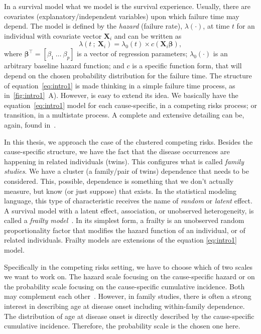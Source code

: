 In a survival model what we model is the survival experience. Usually,
there are covariates (explanatory/independent variables) upon which
failure time may depend. The model is defined by the \textit{hazard}
(failure rate), \(\lambda(\cdot)\), at time \(t\) for an individual with
covariate vector \(\mathbf{X}_{i}\) and can be written as
\begin{equation}
  \lambda(t~;~\mathbf{X}_{i}) =
  \lambda_{0}(t) \times c(\mathbf{X}_{i} \bm{\beta}),
  \label{eq:intro1}
\end{equation}
where \(\bm{\beta}^{\top} = [\beta_{1}~\dots~\beta_{p}]\) is a vector
of regression parameters; \(\lambda_{0}(\cdot)\) is an arbitrary
baseline hazard function; and \(c\) is a specific function form, that
will depend on the chosen probability distribution for the failure time.
The structure of equation~\ref{eq:intro1} is made thinking in a simple
failure time process, as in~\autoref{fig:intro1}~A). However, is easy to
extend its idea. We basically have the equation~\ref{eq:intro1} model
for each cause-specific, in a competing risks process; or transition, in
a multistate process. A complete and extensive detailing can be, again,
found in~.

In this thesis, we approach the case of the clustered competing risks.
Besides the cause-specific structure, we have the fact that the disease
occurrences are happening in related individuals (twins). This
configures what is called \textit{family studies}. We have a cluster (a
family/pair of twins) dependence that needs to be considered. This,
possible, dependence is something that we don't actually measure, but
know (or just suppose) that exists. In the statistical modeling
language, this type of characteristic receives the name of
\textit{random} or \textit{latent} effect. A survival model with a
latent effect, association, or unobserved heterogeneity, is called a
\textit{frailty model}~\cite{frailty78, frailty79}. In its simplest
form, a frailty is an unobserved random proportionality factor that
modifies the hazard function of an individual, or of related
individuals. Frailty models are extensions of the equation
\ref{eq:intro1} model.

Specifically in the competing risks setting, we have to choose which of
two scales we want to work on. The hazard scale focusing on the
cause-specific hazard or on the probability scale focusing on the
cause-specific cumulative incidence. Both may complement each
other~\cite{andersen12}. However, in family studies, there is often a
strong interest in describing age at disease onset including
within-family dependence. The distribution of age at disease onset is
directly described by the cause-specific cumulative incidence.
Therefore, the probability scale is the chosen one here.


